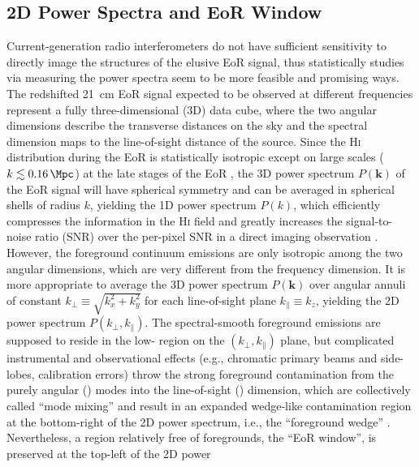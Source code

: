 \documentclass[modern]{aastex62}
\newcommand{\Hi}{H\textsc{i}}
\newcommand{\klos}{\text{$k_{\parallel}$}}
\newcommand{\kperp}{\text{$k_{\bot}$}}
\begin{document}
\subsection{2D Power Spectra and EoR Window}
\label{sec:ps2d}

Current-generation radio interferometers do not have sufficient sensitivity
to directly image the structures of the elusive EoR signal,
thus statistically studies via measuring the power spectra seem to be
more feasible and promising ways.
The redshifted 21~cm EoR signal expected to be observed at different
frequencies represent a fully three-dimensional (3D) data cube, where the
two angular dimensions describe the transverse distances on the sky and
the spectral dimension maps to the line-of-sight distance of the source.
{\color{cyan}%
Since the \Hi{} distribution during the EoR is statistically isotropic
except on large scales ($k \lesssim \SI{0.16}{\per\Mpc}$) at the late
stages of the EoR \citep[e.g.,][]{datta2012}},
the 3D power spectrum $P(\mathbf{k})$ of the EoR signal
will have spherical symmetry and can be averaged in spherical shells of
radius $k$, yielding the 1D power spectrum $P(k)$, which efficiently
compresses the information in the \Hi{} field and greatly increases the
signal-to-noise ratio (SNR) over the per-pixel SNR in a direct imaging
observation \citep{morales2004,morales2006,datta2010}.
However, the foreground continuum emissions are only isotropic among the
two angular dimensions, which are very different from the frequency
dimension.
It is more appropriate to average the 3D power spectrum $P(\mathbf{k})$
over angular annuli of constant $\kperp \equiv \sqrt{k_x^2 + k_y^2}$
for each line-of-sight plane $\klos \equiv k_z$, yielding the 2D power
spectrum $P(\kperp, \klos)$.
The spectral-smooth foreground emissions are supposed to reside in the
low-\klos{} region on the $(\kperp, \klos)$ plane,
but complicated instrumental and observational effects (e.g., chromatic
primary beams and side-lobes, calibration errors) throw the strong
foreground contamination from the purely angular (\kperp) modes into the
line-of-sight (\klos) dimension, which are collectively called
\enquote{mode mixing} and result in an expanded wedge-like contamination
region at the bottom-right of the 2D power spectrum, i.e., the
\enquote{foreground wedge} \citep[e.g.,][]{datta2010,morales2012,liu2014}.
Nevertheless, a region relatively free of foregrounds,
the \enquote{EoR window}, is preserved at the top-left of the 2D power
\end{document}
